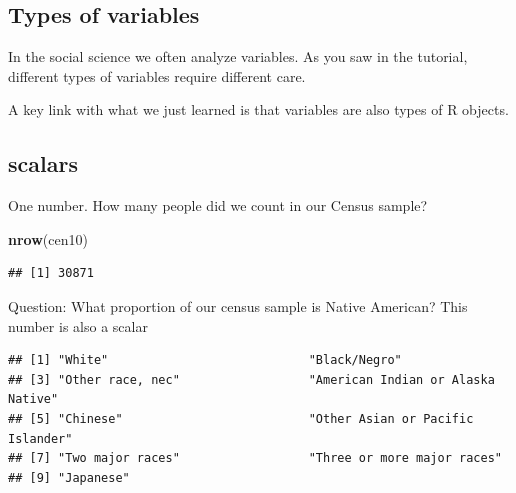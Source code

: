 \documentclass[]{book}
\newenvironment{Shaded}{\begin{snugshade}}{\end{snugshade}}
\newcommand{\CommentTok}[1]{\textcolor[rgb]{0.56,0.35,0.01}{\textit{#1}}}
\newcommand{\KeywordTok}[1]{\textcolor[rgb]{0.13,0.29,0.53}{\textbf{#1}}}
\newcommand{\NormalTok}[1]{#1}
\newcommand{\OperatorTok}[1]{\textcolor[rgb]{0.81,0.36,0.00}{\textbf{#1}}}
\newcommand{\StringTok}[1]{\textcolor[rgb]{0.31,0.60,0.02}{#1}}
\theoremstyle{definition}
\theoremstyle{definition}
\theoremstyle{definition}
\theoremstyle{remark}
\begin{document}
\begin{Shaded}
\begin{Highlighting}[]
\begin{Shaded}
\begin{Highlighting}[]
\begin{Shaded}
\begin{Highlighting}[]
\hypertarget{types-of-variables}{%
\section{Types of variables}\label{types-of-variables}}

In the social science we often analyze variables. As you saw in the tutorial, different types of variables require different care.

A key link with what we just learned is that variables are also types of R objects.

\hypertarget{scalars}{%
\subsection{scalars}\label{scalars}}

One number. How many people did we count in our Census sample?

\begin{Shaded}
\begin{Highlighting}[]
\KeywordTok{nrow}\NormalTok{(cen10)}
\end{Highlighting}
\end{Shaded}

\begin{verbatim}
## [1] 30871
\end{verbatim}

Question: What proportion of our census sample is Native American? This number is also a scalar

\begin{Shaded}
\end{Shaded}

\begin{verbatim}
## [1] "White"                            "Black/Negro"                     
## [3] "Other race, nec"                  "American Indian or Alaska Native"
## [5] "Chinese"                          "Other Asian or Pacific Islander" 
## [7] "Two major races"                  "Three or more major races"       
## [9] "Japanese"
\end{verbatim}

\begin{Shaded}
\end{Shaded}


\end{Highlighting}
\end{Shaded}
\end{Highlighting}
\end{Shaded}
\end{Highlighting}
\end{Shaded}
\end{document}
